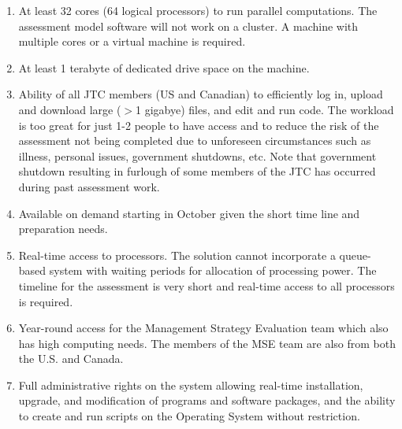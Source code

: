 \documentclass[12pt]{book}\usepackage[]{graphicx}\usepackage[]{color}
\begin{document}
\begin{enumerate}

  \item At least 32 cores (64 logical processors) to run parallel computations.
    The assessment model software will not work on a cluster. A machine with
    multiple cores or a virtual machine is required.

 \item At least 1 terabyte of dedicated drive space on the machine.

  \item Ability of all JTC members (US and Canadian) to efficiently log in,
    upload and download large ($>$1 gigabye) files, and edit and run code.
    The workload is too great for just 1-2 people to have access
    and to reduce the risk of the
    assessment not being completed due to unforeseen circumstances
    such as illness, personal issues, government shutdowns, etc. Note that
    government shutdown resulting in furlough of some members of the JTC has
    occurred during past assessment work.

  \item Available on demand starting in October given
    the short time line and preparation needs.

  \item Real-time access to processors. The solution cannot incorporate a
    queue-based system with waiting periods for allocation of processing power.
    The timeline for the assessment is very short and real-time access to all
    processors is required.

  \item Year-round access for the Management Strategy Evaluation team which also
    has high computing needs. The members of the MSE team are also from both
    the U.S. and Canada.

  \item Full administrative rights on the system allowing real-time installation,
    upgrade, and modification of programs and software packages, and the ability to
    create and run scripts on the Operating System without restriction.


\end{enumerate}
\end{document}
